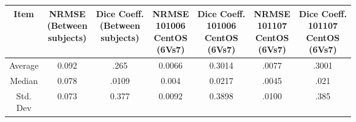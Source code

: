 \hfill \break
\begin{center}
\begin{tabularx}{\textwidth}{|c|c|c|c|c|c|c|}
\hline
Item  & \makecell[l]{NRMSE\\(Between\\subjects)} & \makecell[l]{Dice Coeff.\\(Between\\subjects)} & \makecell[l]{NRMSE\\101006\\CentOS\\(6Vs7)} & \makecell[l]{Dice Coeff.\\101006\\CentOS\\(6Vs7)} & \makecell[l]{NRMSE\\101107\\CentOS\\(6Vs7)} & \makecell[l]{Dice Coeff.\\101107\\CentOS\\(6Vs7)} \\ \hline
Average            & 0.092                                        & .265                                               & 0.0066                                                & 0.3014                                                      & .0077                                                 & .3001                                                       \\ \hline
Median             & 0.078                                        & .0109                                              & 0.004                                                 & 0.0217                                                      & .0045                                                 & .021                                                        \\ \hline
\makecell[l]{Std.\\Dev} & 0.073                                        & 0.377                                              & 0.0092         & 0.3898   & .0100                                                 & .385                                        \\ \hline
\end{tabularx}
\label{tab:comparison_table}
\end{center}
